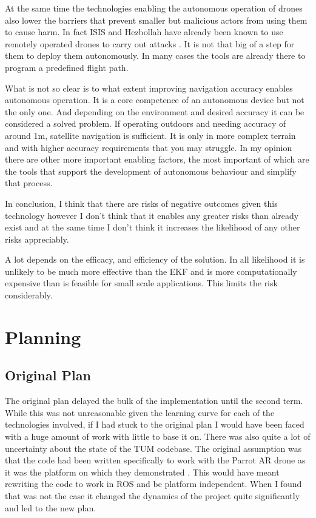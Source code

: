 \documentclass[]{../resources/final_report}
\begin{document}
At the same time the technologies enabling the autonomous operation of drones also lower the barriers that prevent smaller but malicious actors from using them to cause harm. In fact ISIS and Hezbollah have already been known to use remotely operated drones to carry out attacks \cite{plaw_santoro_2017}\cite{warrick_2017}. It is not that big of a step for them to deploy them autonomously. In many cases the tools are already there to program a predefined flight path.

What is not so clear is to what extent improving navigation accuracy enables autonomous operation. It is a core competence of an autonomous device \cite{Autonomous_robot} but not the only one. And depending on the environment and desired accuracy it can be considered a solved problem. If operating outdoors and needing accuracy of around 1m, satellite navigation is sufficient. It is only in more complex terrain and with higher accuracy requirements that you may struggle. In my opinion there are other more important enabling factors, the most important of which are the tools that support the development of autonomous behaviour and simplify that process.

In conclusion, I think that there are risks of negative outcomes given this technology however I don’t think that it enables any greater risks than already exist and at the same time I don’t think it increases the likelihood of any other risks appreciably.

A lot depends on the efficacy, and efficiency of the solution. In all likelihood it is unlikely to be much more effective than the EKF and is more computationally expensive than is feasible for small scale applications. This limits the risk considerably.


\chapter{Planning}

\section{Original Plan}

The original plan delayed the bulk of the implementation until the second term. While this was not unreasonable given the learning curve for each of the technologies involved, if I had stuck to the original plan I would have been faced with a huge amount of work with little to base it on. There was also quite a lot of uncertainty about the state of the TUM codebase. The original assumption was that the code had been written specifically to work with the Parrot AR drone as it was the platform on which they demonstrated \cite{Engel:Camera-basedNav}. This would have meant rewriting the code to work in ROS and be platform independent. When I found that was not the case it changed the dynamics of the project quite significantly and led to the new plan.
\end{document}
